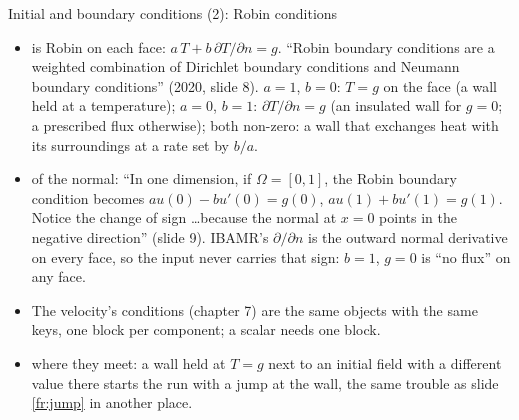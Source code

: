 \documentclass[aspectratio=169,11pt]{beamer}
\begin{document}
\begin{frame}{Initial and boundary conditions (2): Robin conditions}
\label{fr:robin}
\footnotesize
\begin{itemize}
  \item {} is Robin on each face: $a\,T + b\,\partial T/\partial n = g$. ``Robin boundary conditions are a weighted combination of Dirichlet boundary conditions and Neumann boundary conditions'' (2020, slide 8). $a = 1$, $b = 0$: $T = g$ on the face (a wall held at a temperature); $a = 0$, $b = 1$: $\partial T/\partial n = g$ (an insulated wall for $g = 0$; a prescribed flux otherwise); both non-zero: a wall that exchanges heat with its surroundings at a rate set by $b/a$.
  \item {} of the normal: ``In one dimension, if $\Omega = [0, 1]$, the Robin boundary condition becomes $a u(0) - b u'(0) = g(0)$, $a u(1) + b u'(1) = g(1)$. Notice the change of sign \ldots because the normal at $x = 0$ points in the negative direction'' (slide 9). IBAMR's $\partial/\partial n$ is the outward normal derivative on every face, so the input never carries that sign: $b = 1$, $g = 0$ is ``no flux'' on any face.
  \item The velocity's conditions (chapter 7) are the same objects with the same keys, one block per component; a scalar needs one block.
  \item {} where they meet: a wall held at $T = g$ next to an initial field with a different value there starts the run with a jump at the wall, the same trouble as slide \ref{fr:jump} in another place.
\end{itemize}
\end{frame}
\end{document}
